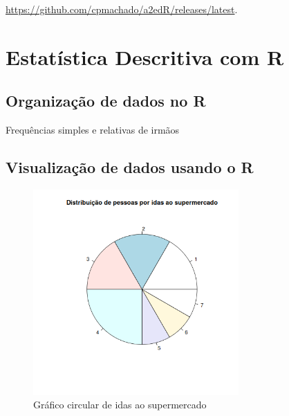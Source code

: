 \documentclass[11pt,a4paper]{report}
\begin{document}
\begin{center}
	\url{https://github.com/cpmachado/a2edR/releases/latest}.
\end{center}


\setcounter{chapter}{2}
\chapter{Estatística Descritiva com R}
\section{Organização de dados no R}



\begin{table}[h!]
	\centering
	\caption{Frequências simples e relativas de irmãos}
	\label{tab:3.1}
\end{table}

\clearpage

\section{Visualização de dados usando o R}

\begin{figure}[h!]
	\centering
	\includegraphics[width=0.7\textwidth]{imagem/ex3_2.png}
	\caption{Gráfico circular de idas ao supermercado}
\end{figure}

\end{document}
